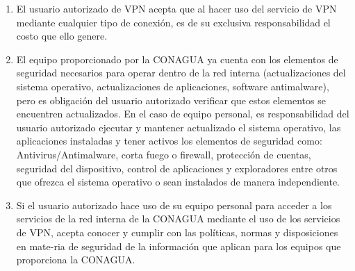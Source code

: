 \documentclass[letterpaper,11pt]{article}
\begin{document}
{\begin{enumerate}
	\item El usuario autorizado de VPN acepta que al hacer uso del servicio de VPN mediante cualquier tipo de conexión, es de su exclusiva responsabilidad el costo que ello genere.
           \item El equipo proporcionado por la CONAGUA ya cuenta con los elementos de seguridad necesarios para operar dentro de la red interna (actualizaciones del sistema operativo, actualizaciones de aplicaciones, software antimalware), pero es obligación del usuario autorizado verificar que estos elementos se encuentren actualizados. En el caso de equipo personal, es responsabilidad del usuario autorizado ejecutar y mantener actualizado el sistema operativo, las aplicaciones instaladas y tener activos los elementos de seguridad como: Antivirus/Antimalware, corta fuego o firewall, protección de cuentas, seguridad del dispositivo, control de aplicaciones y exploradores entre otros que ofrezca el sistema operativo o sean instalados de manera independiente.
            \item Si el usuario autorizado hace uso de su equipo personal para acceder a los servicios de la red interna de la CONAGUA mediante el uso de los servicios de VPN, acepta conocer y cumplir con las políticas, normas y disposiciones en mate-ria de seguridad de la información que aplican para los equipos que proporciona la CONAGUA.

\end{enumerate}}
\end{document}
